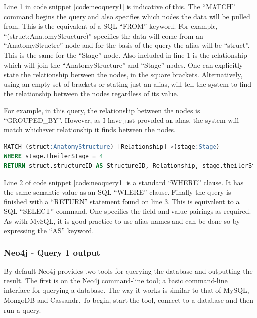 Line 1 in code snippet \ref{code:neoquery1} is indicative of this. The ``MATCH'' command begins the query and also specifies which nodes the data will be pulled from. This is the equivalent of a SQL ``FROM'' keyword. For example, ``(struct:AnatomyStructure)'' specifies the data will come from an ``AnatomyStructre'' node and for the basis of the query the alias will be ``struct''. This is the same for the ``Stage'' node. Also included in line 1 is the relationship which will join the ``AnatomyStructure'' and ``Stage'' nodes. One can explicitly state the relationship between the nodes, in the square brackets. Alternatively, using an empty set of brackets or stating just an alias, will tell the system to find the relationship between the nodes regardless of its value.

For example, in this query, the relationship between the nodes is ``GROUPED\_BY''. However, as I have just provided an alias, the system will match whichever relationship it finds between the nodes.

\begin{lstlisting}[language=SQL, caption=Neo4j query 1 statement. All structures at Theiler Stage X., label=code:neoquery1]
MATCH (struct:AnatomyStructure)-[Relationship]->(stage:Stage)
WHERE stage.theilerStage = 4
RETURN struct.structureID AS StructureID, Relationship, stage.theilerStage AS TheilerStage, stage.dpc AS DPC;
\end{lstlisting}
\parindent 0pt

\parindent 15pt
Line 2 of code snippet \ref{code:neoquery1} is a standard ``WHERE'' clause. It has the same semantic value as an SQL ``WHERE'' clause. Finally the query is finished with a ``RETURN'' statement found on line 3. This is equivalent to a SQL ``SELECT'' command. One specifies the field and value pairings as required. As with MySQL, it is good practice to use alias names and can be done so by expressing the ``AS'' keyword.

\subsubsection*{Neo4j - Query 1 output}\label{neoquery1output}
By default Neo4j provides two tools for querying the database and outputting the result. The first is on the Neo4j command-line tool; a basic command-line interface for querying a database. The way it works is similar to that of MySQL, MongoDB and Cassandr. To begin, start the tool, connect to a database and then run a query.

